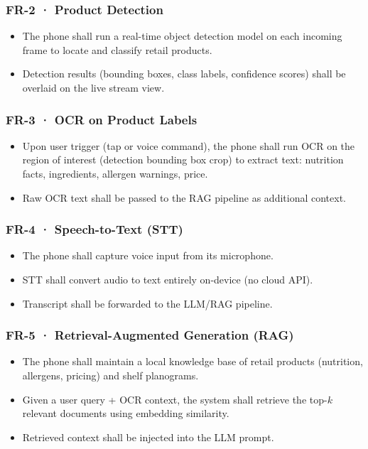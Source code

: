 \documentclass[11pt,a4paper]{article}
\begin{document}
\subsubsection{FR-2 · Product Detection}
\begin{itemize}[noitemsep]
  \item The phone shall run a real-time object detection model on each incoming
        frame to locate and classify retail products.
  \item Detection results (bounding boxes, class labels, confidence scores)
        shall be overlaid on the live stream view.
\end{itemize}

\subsubsection{FR-3 · OCR on Product Labels}
\begin{itemize}[noitemsep]
  \item Upon user trigger (tap or voice command), the phone shall run OCR on
        the region of interest (detection bounding box crop) to extract text:
        nutrition facts, ingredients, allergen warnings, price.
  \item Raw OCR text shall be passed to the RAG pipeline as additional context.
\end{itemize}

\subsubsection{FR-4 · Speech-to-Text (STT)}
\begin{itemize}[noitemsep]
  \item The phone shall capture voice input from its microphone.
  \item STT shall convert audio to text entirely on-device (no cloud API).
  \item Transcript shall be forwarded to the LLM/RAG pipeline.
\end{itemize}

\subsubsection{FR-5 · Retrieval-Augmented Generation (RAG)}
\begin{itemize}[noitemsep]
  \item The phone shall maintain a local knowledge base of retail products
        (nutrition, allergens, pricing) and shelf planograms.
  \item Given a user query + OCR context, the system shall retrieve the top-$k$
        relevant documents using embedding similarity.
  \item Retrieved context shall be injected into the LLM prompt.
\end{itemize}
\end{document}
